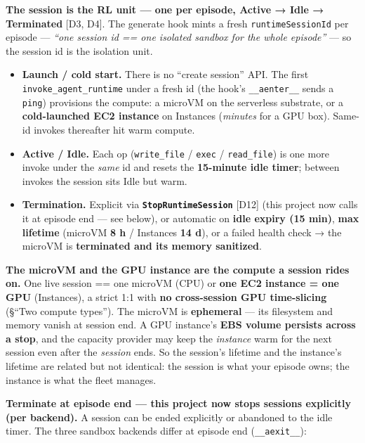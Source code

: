 \documentclass[
  paper=a4,
  ,captions=tableheading
]{scrartcl}
\providecommand{\tightlist}{%
  \setlength{\itemsep}{0pt}\setlength{\parskip}{0pt}}
\begin{document}
\textbf{The session is the RL unit --- one per episode, Active → Idle →
Terminated} {[}D3, D4{]}. The generate hook mints a fresh
\texttt{runtimeSessionId} per episode --- \emph{``one session id == one
isolated sandbox for the whole episode''} --- so the session id is the
isolation unit.

\begin{itemize}
\tightlist
\item
  \textbf{Launch / cold start.} There is no ``create session'' API. The
  first \texttt{invoke\_agent\_runtime} under a fresh id (the hook's
  \texttt{\_\_aenter\_\_} sends a \texttt{ping}) provisions the compute:
  a microVM on the serverless substrate, or a \textbf{cold-launched EC2
  instance} on Instances (\emph{minutes} for a GPU box). Same-id invokes
  thereafter hit warm compute.
\item
  \textbf{Active / Idle.} Each op (\texttt{write\_file} / \texttt{exec}
  / \texttt{read\_file}) is one more invoke under the \emph{same} id and
  resets the \textbf{15-minute idle timer}; between invokes the session
  sits Idle but warm.
\item
  \textbf{Termination.} Explicit via
  \textbf{\texttt{StopRuntimeSession}} {[}D12{]} (this project now calls
  it at episode end --- see below), or automatic on \textbf{idle expiry
  (15 min)}, \textbf{max lifetime} (microVM \textbf{8 h} / Instances
  \textbf{14 d}), or a failed health check → the microVM is
  \textbf{terminated and its memory sanitized}.
\end{itemize}

\textbf{The microVM and the GPU instance are the compute a session rides
on.} One live session == one microVM (CPU) or \textbf{one EC2 instance =
one GPU} (Instances), a strict 1:1 with \textbf{no cross-session GPU
time-slicing} (§``Two compute types''). The microVM is
\textbf{ephemeral} --- its filesystem and memory vanish at session end.
A GPU instance's \textbf{EBS volume persists across a stop}, and the
capacity provider may keep the \emph{instance} warm for the next session
even after the \emph{session} ends. So the session's lifetime and the
instance's lifetime are related but not identical: the session is what
your episode owns; the instance is what the fleet manages.

\textbf{Terminate at episode end --- this project now stops sessions
explicitly (per backend).} A session can be ended explicitly or
abandoned to the idle timer. The three sandbox backends differ at
episode end (\texttt{\_\_aexit\_\_}):
\end{document}
